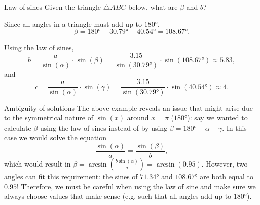 \begin{example}{Law of sines}{}
	Given the triangle $\triangle ABC$ below, what are $\beta$ and $b$?

	\vspace{2em}
	\centering

	\vspace{1em}
	\flushleft
	Since all angles in a triangle must add up to $\ang{180}$,
	\[
		\beta=\ang{180}-\ang{30.79}-\ang{40.54}=\ang{108.67}.
	\]

	Using the law of sines,
	\[
		b = \frac{a}{\sin(\alpha)}\cdot\sin(\beta) = \frac{3.15}{\sin(\ang{30.79})}\cdot\sin(\ang{108.67}) \approx 5.83,
	\]
	and
	\[
		c = \frac{a}{\sin(\alpha)}\cdot\sin(\gamma) = \frac{3.15}{\sin(\ang{30.79})}\cdot\sin(\ang{40.54}) \approx 4.
	\]
\end{example}

\begin{note}{Ambiguity of solutions}{}
	The above example reveals an issue that might arise due to the symmetrical nature of $\sin(x)$ around $x=\pi$ ($\ang{180}$): say we wanted to calculate $\beta$ using the law of sines instead of by using $\beta=\ang{180}-\alpha-\gamma$. In this case we would solve the equation
	\[
		\frac{\sin(\alpha)}{a} = \frac{\sin(\beta)}{b},
	\]
	which would result in $\beta=\arcsin\left( \frac{b\sin(\alpha)}{a}  \right)=\arcsin\left( 0.95 \right)$. However, two angles can fit this requirement: the sines of $\ang{71.34}$ and $\ang{108.67}$ are both equal to $0.95$! Therefore, we must be careful when using the law of sine and make sure we always choose values that make sense (e.g. such that all angles add up to $\ang{180}$).
\end{note}


